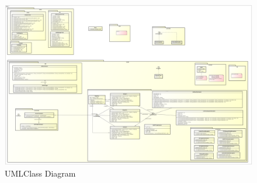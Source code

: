 \documentclass[a4paper,12pt]{scrreprt}
\begin{document}
\begin{figure}[h!]
\centering
\caption{UMLClass Diagram}
\label{fig:RTNUmlImage}
\includegraphics[width=1.0\textwidth]{RTNUmlImage}
\end{figure}
\end{document}
